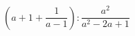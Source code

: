 \begin{ex}[type=expression]
	\begin{condition}
		\(\left( a+1+\dfrac{1}{a-1} \right):\dfrac{a^2}{a^2-2a+1}\)
	\end{condition}
\end{ex}